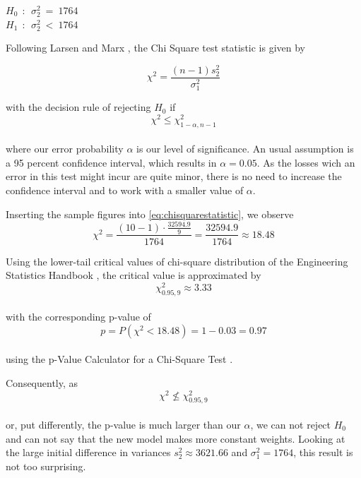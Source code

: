 \begin{center}
$H_0~~:~~ \sigma^2_2~=~1764$\\ 
$H_1~~:~~ \sigma^2_2~<~1764$
\end{center}

Following Larsen and Marx \cite[Chapter 7.5]{larsen2005introduction}, the Chi Square test statistic is given by 

\begin{equation}
\chi^2 = \frac{(n-1)s_2^2}{\sigma_1^2}
\label{eq:chisquarestatistic}
\end{equation}

with the decision rule of rejecting $H_0$ if 
\\
\begin{equation}
\chi^2 \leq \chi^2_{1-\alpha,n-1}
\label{eq:decisionrule}
\end{equation}
\\
where our error probability $\alpha$ is our level of significance. An usual assumption is a 95 percent confidence interval, which results in $\alpha = 0.05$. As the losses wich an error in this test might incur are quite minor, there is no need to increase the confidence interval and to work with a smaller value of $\alpha$.


Inserting the sample figures into \eqref{eq:chisquarestatistic}, we observe 
\begin{equation}
\chi^2 = \frac{(10-1) \cdot \frac{32594.9}{9}}{1764} = \frac{32594.9}{1764} \approx 18.48
\label{eq:chisqstatcalc}
\end{equation}

Using the lower-tail critical values of chi-square distribution of the Engineering Statistics Handbook \cite{nist}, the critical value is approximated by 
\\
\begin{equation}
\chi^2_{0.95,9}\approx 3.33
\label{eq:criticalvalue}
\end{equation}
\\
with the corresponding p-value of
\\
\begin{equation}
p = P(\chi^2 < 18.48) = 1-0.03 = 0.97
\label{eq:pvalue}
\end{equation}
\\
using the p-Value Calculator for a Chi-Square Test \cite{freepvalue}. 

Consequently, as 
\\
\begin{equation}
\chi^2 \nleq \chi^2_{0.95,9}
\label{eq:criticalvalue}
\end{equation}
\\
or, put differently, the p-value is much larger than our $\alpha$, we can not reject $H_0$ and can not say that the new model makes more constant weights. Looking at the large initial difference in variances $s_2^2 \approx 3621.66 $ and $\sigma^2_1 = 1764$, this result is not too surprising. 




